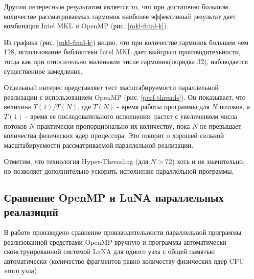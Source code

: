 Другим интересным результатом является то, что при достаточно большом количестве рассматриваемых гармоник
наиболее эффективный результат дает комбинация Intel MKL и OpenMP (рис. \ref{mkl-final-k}).

Из графика (рис. \ref{mkl-final-k}) видно, что при количестве гармоник большем чем 128, использование библиотеки Intel MKL
дает выйгрыш производительности, тогда как при относительно маленьком числе гармоник(порядка 32), наблюдается существенное замедление.


Отдельный интерес представляет тест масштабируемости параллельной реализации с использованием OpenMP (рис. \ref{perf-threads}).
Он показывает, что величина $T(1)/T(N)$, где $T(N)$ - время работы программы для $N$ потоков, а $T(1)$ - время ее последовательного исполнения, растет с увеличением числа потоков $N$ практически пропорционально их количеству, пока $N$ не превышает количества физических ядер процессора. Это говорит о хорошей сильной масштабируемости рассматриваемой параллельной реализации.


Отметим, что технология Hyper-Threading (для $N>72$) хоть и не значительно, но позволяет дополнительно ускорить исполнение параллельной программы.

\subsection{Сравнение OpenMP и LuNA параллельных реалазиций}
В работе произведено сравнение производительности параллельной программы реализованной средствами OpenMP вручную
и программы автоматически сконструированной системой LuNA для одного узла с общей памятью автоматически (количество фрагментов
равно количеству физических ядер CPU этого узла).

